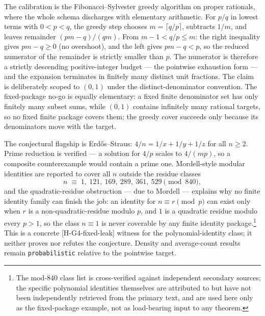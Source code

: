 \documentclass[11pt]{article}
\theoremstyle{definition}
\begin{document}
The calibration is the Fibonacci--Sylvester greedy algorithm on proper rationals, where the whole
schema discharges with elementary arithmetic. For $p/q$ in lowest terms with $0 < p < q$, the greedy
step chooses $m = \lceil q/p \rceil$, subtracts $1/m$, and leaves remainder $(pm - q)/(qm)$. From
$m - 1 < q/p \le m$: the right inequality gives $pm - q \ge 0$ (no overshoot), and the left gives
$pm - q < p$, so the reduced numerator of the remainder is strictly smaller than $p$. The numerator
is therefore a strictly descending positive-integer budget --- the pointwise exhaustion form --- and
the expansion terminates in finitely many distinct unit fractions. The claim is deliberately scoped
to $(0,1)$ under the distinct-denominator convention. The fixed-package no-go is equally elementary:
a fixed finite denominator set has only finitely many subset sums, while $(0,1)$ contains infinitely
many rational targets, so no fixed finite package covers them; the greedy cover succeeds only because
its denominators move with the target.

The conjectural flagship is Erd\H{o}s--Straus: $4/n = 1/x + 1/y + 1/z$ for all $n \ge 2$. Prime
reduction is verified --- a solution for $4/p$ scales to $4/(mp)$, so a composite counterexample
would contain a prime one. Mordell-style modular identities are reported to cover all $n$ outside the
residue classes
\[
  n \;\equiv\; 1,\ 121,\ 169,\ 289,\ 361,\ 529 \pmod{840},
\]
and the quadratic-residue obstruction --- due to Mordell --- explains why no finite identity family
can finish the job: an identity for $n \equiv r \pmod{p}$ can exist only when $r$ is a
non-quadratic-residue modulo $p$, and $1$ is a quadratic residue modulo every $p > 1$, so the class
$n \equiv 1$ is never coverable by any finite identity package.\footnote{The mod-$840$ class list is
cross-verified against independent secondary sources; the specific polynomial identities themselves
are attributed to \citet[Ch.~30]{Mordell1969} but have not been independently retrieved from the
primary text, and are used here only as the fixed-package example, not as load-bearing input to any
theorem.} This is a concrete \textup{[H-G4-fixed-leak]} witness for the polynomial-identity class; it
neither proves nor refutes the conjecture. Density and average-count results
\citep{Vaughan1970,ElsholtzTao2013} remain \texttt{probabilistic} relative to the pointwise target.
\end{document}
